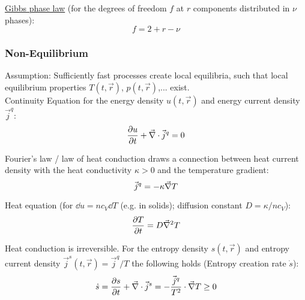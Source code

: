 			\noindent
			\href{https://en.wikipedia.org/wiki/Phase_rule}{Gibbs phase law} (for the degrees of freedom $f$ at $r$ components distributed in $\nu$ phases):
			\begin{equation}
				f = 2 + r - \nu
			\end{equation}

		\subsubsection{Non-Equilibrium}
			\noindent
			Assumption: Sufficiently fast processes create local equilibria, such that local equilibrium properties $T(t,\vec{r})$, $p(t,\vec{r})$,... exist. \\
			Continuity Equation for the energy density $u(t,\vec{r})$ and energy current density $\vec{j}^q$:
			\begin{equation}
				\frac{\partial u}{\partial t} + \vec{\nabla}\cdot\vec{j}^q = 0
			\end{equation}

			\noindent
			Fourier's law / law of heat conduction draws a connection between heat current density with the heat conductivity $\kappa >0$ and the temperature gradient:
			\begin{equation}
				\vec{j}^q = -\kappa \vec{\nabla} T
			\end{equation}

			\noindent
			Heat equation (for $\dd u = nc_V \dd T$ (e.g. in solids); diffusion constant $D=\kappa/nc_V$):
			\begin{equation}
				\frac{\partial T}{\partial t} = D\vec{\nabla}^2 T
			\end{equation}

			\noindent
			Heat conduction is irreversible. For the entropy density $s(t,\vec{r})$ and entropy current density $\vec{j}^s (t,\vec{r}) = \vec{j}^q/T$ the following holds (Entropy creation rate $\dot{s}$):
			\begin{equation}
				\dot{s} = \frac{\partial s}{\partial t} + \vec{\nabla}\cdot\vec{j}^s = - \frac{\vec{j}^q}{T^2}\cdot\vec{\nabla} T \ge 0
			\end{equation}

